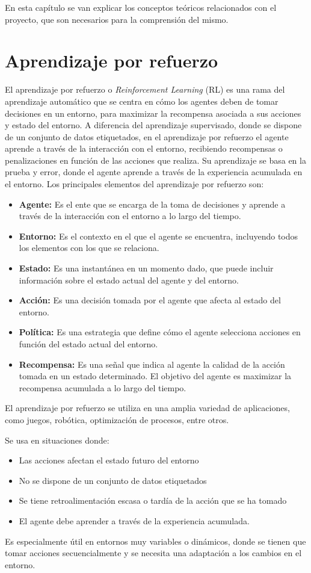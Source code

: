 En esta capítulo se van explicar los conceptos teóricos relacionados con el proyecto, que son necesarios para la comprensión del mismo.

\section{Aprendizaje por refuerzo}
El aprendizaje por refuerzo o \textit{Reinforcement Learning} (RL) es una rama del aprendizaje automático que se centra en cómo los agentes deben de tomar decisiones en un entorno, para maximizar la recompensa asociada a sus acciones y estado del entorno. A diferencia del aprendizaje supervisado, donde se dispone de un conjunto de datos etiquetados, en el aprendizaje por refuerzo el agente aprende a través de la interacción con el entorno, recibiendo recompensas o penalizaciones en función de las acciones que realiza. Su aprendizaje se basa en la prueba y error, donde el agente aprende a través de la experiencia acumulada en el entorno. 
Los principales elementos del aprendizaje por refuerzo son:
\begin{itemize}
	\item \textbf{Agente:} Es el ente que se encarga de la toma de decisiones y aprende a través de la interacción con el entorno a lo largo del tiempo.
	\item \textbf{Entorno:} Es el contexto en el que el agente se encuentra, incluyendo todos los elementos con los que se relaciona.
	\item \textbf{Estado:} Es una instantánea en un momento dado, que puede incluir información sobre el estado actual del agente y del entorno.
	\item \textbf{Acción:} Es una decisión tomada por el agente que afecta al estado del entorno.
	\item \textbf{Política:} Es una estrategia que define cómo el agente selecciona acciones en función del estado actual del entorno.
	\item \textbf{Recompensa:} Es una señal que indica al agente la calidad de la acción tomada en un estado determinado. El objetivo del agente es maximizar la recompensa acumulada a lo largo del tiempo.
\end{itemize}

El aprendizaje por refuerzo se utiliza en una amplia variedad de aplicaciones, como juegos, robótica, optimización de procesos, entre otros.

Se usa en situaciones donde:
\begin{itemize}
	\item Las acciones afectan el estado futuro del entorno
	\item No se dispone de un conjunto de datos etiquetados
	\item Se tiene retroalimentación escasa o tardía de la acción que se ha tomado
	\item El agente debe aprender a través de la experiencia acumulada.
\end{itemize}
Es especialmente útil en entornos muy variables o dinámicos, donde se tienen que tomar acciones secuencialmente y se necesita una adaptación a los cambios en el entorno.


